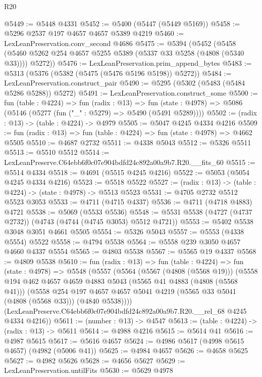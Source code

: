 \begin{lexlean}{R20}
\begin{coremodule}
@5449 := @5448 @4331
@5452 := @5400 (@5447 (@5449 @5169))
@5458 := @5296 @2537 @197 @4657 @4657 @5389 @4219
@5460 := LexLeanPreservation.conv_second @4686
@5475 := @5394
    (@5452 (@5458 (@5460 @5262 @254 @4657 @5255 @5389 (@5337 @33 @5258 (@4808 (@5340 @33)))) @5272))
@5476 := LexLeanPreservation.prim_append_bytes
@5483 := @5313 (@5376 (@5382 (@5475 (@5476 @5196 @5198)) @5272))
@5484 := LexLeanPreservation.construct_pair
@5490 := @5295 (@5302 (@5483 (@5484 @5286 @5288)) @5272)
@5491 := LexLeanPreservation.construct_some
@5500 := fun (table : @4224) =>
  fun (radix : @13) =>
  fun (state : @4978) => @5086 (@5146 (@5277 (fun ("_" : @5279) => @5490 (@5491 @5289))))
@5502 := (radix : @13) -> (table : @4224) -> @4979
@5505 := @5047 @4245 @4334 @4216
@5509 := fun (radix : @13) => fun (table : @4224) => fun (state : @4978) => @4662 @5505
@5510 := @4687 @2732
@5511 := @4338 @5043
@5512 := @5326 @5511
@5513 := @5510 @5512
@5514 := LexLeanPreserve.C64ebb6f0c07e904bdfd24c892a00a9b7.R20.__fits_60
@5515 := @5514 @4334
@5518 := @4691 (@5515 @4245 @4216)
@5522 := @5053 (@5054 @4245 @4334 @4216)
@5523 := @5518 @5522
@5527 := (radix : @13) -> (table : @4224) -> (state : @4978) -> @5513 @5523
@5531 := @4705 @2732 @5512 @5523 @3053
@5533 := @4711 (@4715 @4337)
@5536 := @4711 (@4718 @4883) @4721
@5538 := @5069 (@5533 @5536)
@5548 := @5531 @5538 (@4727 (@4737 @2732)) (@4743 (@4744 (@4745 @3053) @5512 @4721))
@5553 := @5402 @5538 @3048 @3051 @4661 @5505
@5554 := @5326 @5043
@5557 := @5553 (@4338 @5554) @5522
@5558 := @4794 @5538
@5564 := @5558 @239 @3050 @4657 @4660 @4337 @5554
@5565 := @4803 @5538
@5567 := @5565 @19 @4337
@5568 := @4809 @5538
@5610 := fun (radix : @13) =>
  fun (table : @4224) =>
  fun (state : @4978) =>
  @5548
    (@5557
      (@5564
        (@5567 (@4808 (@5568 @19)))
        (@5558
          @194
          @462
          @4657
          @4659
          @4883
          @5043
          (@5565 @41 @4883 (@4808 (@5568 @41)))
          (@5558
            @254
            @197
            @4657
            @4657
            @5041
            @4219
            (@5565 @33 @5041 (@4808 (@5568 @33)))
            (@4840 @5538))))
      (LexLeanPreserve.C64ebb6f0c07e904bdfd24c892a00a9b7.R20.__rel_68 @4245 @4334 @4216))
@5611 := (number : @13) -> @4547
@5613 := (table : @4224) -> (radix : @13) -> @5611
@5614 := @4988 @4216
@5615 := @5614 @41
@5616 := @4987 @5615
@5617 := @5616 @4657
@5624 := @4986 @5617 (@4998 @5615 @4657) (@4982 (@5006 @41))
@5625 := @4984 @4657
@5626 := @4658 @5625
@5627 := @4982 @5626
@5628 := @4656 @5627
@5629 := LexLeanPreservation.untilFits
@5630 := @5629 @4978

\end{coremodule}
\end{lexlean}
